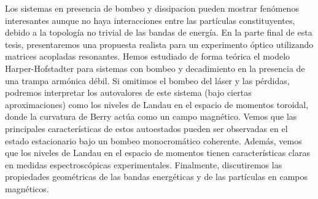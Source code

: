 \documentclass{article}
\begin{document}
Los sistemas en presencia de bombeo y dissipacion pueden mostrar
fen\'omenos interesantes aunque no haya interacciones entre las
part\'iculas constituyentes, debido a la topolog\'ia no trivial de las
bandas de energ\'ia. En la parte final de esta tesis, presentaremos
una propuesta realista para un experimento \'optico utilizando
matrices acopladas resonantes. Hemos estudiado de forma te\'orica el
modelo Harper-Hofstadter para sistemas con bombeo y decadimiento en
la presencia de una trampa arm\'onica d\'ebil. Si omitimos el bombeo
del l\'aser y las p\'erdidas, podremos interpretar los autovalores de
este sistema (bajo ciertas aproximaciones) como los niveles de Landau
en el espacio de momentos toroidal, donde la curvatura de Berry
act\'ua como un campo magn\'etico. Vemos que las principales
caracter\'isticas de estos autoestados pueden ser observadas en el
estado estacionario bajo un bombeo monocrom\'atico
coherente. Adem\'as, vemos que los niveles de Landau en el espacio de
momentos tienen caracter\'isticas claras en medidas espectrosc\'opicas
experimentales. Finalmente, discutiremos las propiedades geom\'etricas
de las bandas energ\'eticas y de las part\'iculas en campos
magn\'eticos.
\end{document}
